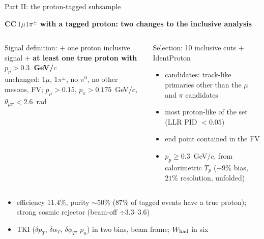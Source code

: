 \documentclass[aspectratio=169,10pt]{beamer}
\newcommand{\GeVc}{~GeV/$c$}
\begin{document}
\begin{frame}{Part II: the proton-tagged subsample}
  \begin{center}\color{ubdark}\bfseries
  CC$\,1\mu1\pi^{\pm}$ with a tagged proton: two changes to the inclusive analysis
  \end{center}
  \begin{columns}[T]
  \begin{block}{Signal definition: $+$ one proton}
    \small
    inclusive signal $+$ \textbf{at least one true proton with $p_p>0.3$\GeVc}\\[4pt]
    \footnotesize unchanged: $1\mu$, $1\pi^\pm$, no $\pi^0$, no other mesons, FV;
    $p_\mu>0.15$, $p_\pi>0.175$\GeVc, $\theta_{\mu\pi}<2.6$~rad
  \end{block}
  \begin{block}{Selection: 10 inclusive cuts $+$ IdentProton}
    \footnotesize
    \begin{itemize}\itemsep1pt
      \item candidates: track-like primaries other than the $\mu$ and $\pi$ candidates
      \item most proton-like of the set (LLR PID $<0.05$)
      \item end point contained in the FV
      \item $p_p\geq0.3$\GeVc, from calorimetric $T_p$ ($-9\%$ bias, $21\%$ resolution, unfolded)
    \end{itemize}
  \end{block}
  \end{columns}
  \vspace{4pt}
  \footnotesize
  \begin{itemize}\itemsep2pt
    \item efficiency $11.4\%$, purity $\sim50\%$ ($87\%$ of tagged events have a true proton); strong cosmic rejector (beam-off $\div3.3$--$3.6$)
    \item TKI ($\delta p_T$, $\delta\alpha_T$, $\delta\phi_T$, $p_n$) in two bins, beam frame; $W_{\rm had}$ in six
  \end{itemize}
\end{frame}
\end{document}
